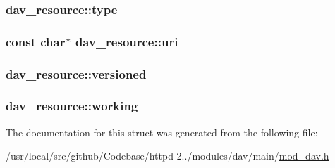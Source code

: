 \subsubsection[{\texorpdfstring{type}{type}}]{ dav\+\_\+resource\+::type}\hypertarget{structdav__resource_afbf280e2cffed77d6b88bc19ef24ae0e}{}\label{structdav__resource_afbf280e2cffed77d6b88bc19ef24ae0e}
\subsubsection[{\texorpdfstring{uri}{uri}}]{\setlength{\rightskip}{0pt plus 5cm}const char$\ast$ dav\+\_\+resource\+::uri}\hypertarget{structdav__resource_a2bc6c2d5b1b4c45493fcff35a07fbf31}{}\label{structdav__resource_a2bc6c2d5b1b4c45493fcff35a07fbf31}
\subsubsection[{\texorpdfstring{versioned}{versioned}}]{ dav\+\_\+resource\+::versioned}\hypertarget{structdav__resource_ad4da7250e7e51d3c4a581143b2089d73}{}\label{structdav__resource_ad4da7250e7e51d3c4a581143b2089d73}
\subsubsection[{\texorpdfstring{working}{working}}]{ dav\+\_\+resource\+::working}\hypertarget{structdav__resource_a22f82e1e79350eee8f78e6ec60a99d8d}{}\label{structdav__resource_a22f82e1e79350eee8f78e6ec60a99d8d}


The documentation for this struct was generated from the following file\+:\begin{DoxyCompactItemize}
\item 
/usr/local/src/github/\+Codebase/httpd-\/2../modules/dav/main/\hyperlink{mod__dav_8h}{mod\+\_\+dav.\+h}\end{DoxyCompactItemize}
